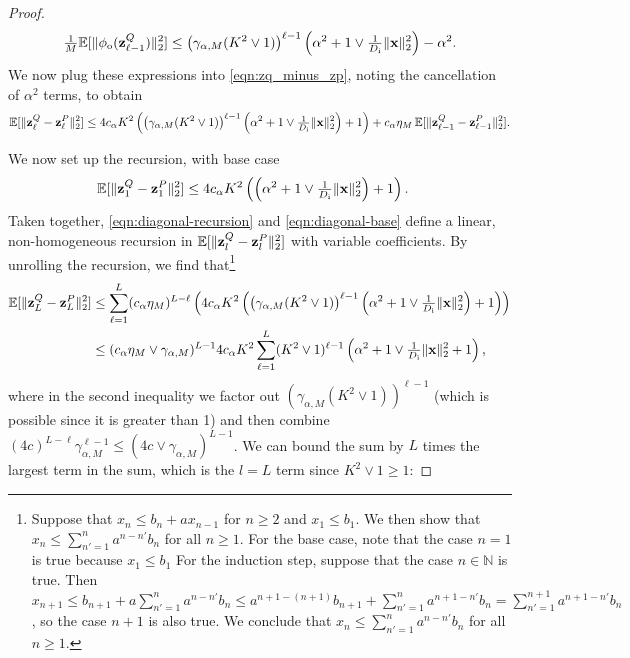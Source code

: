 \documentclass[twoside]{article}
\renewcommand{\ss}[1]{_{\text{#1}}}
\newcommand{\vx}{\mathbf{x}}
\newcommand{\vz}{\mathbf{z}}
\newcommand{\E}{\mathbb{E}}
\newcommand{\N}{\mathbb{N}}
\renewcommand{\ss}[1]{_{\text{#1}}}        %
\DeclarePairedDelimiter\norm{\|}{\|}             %
\theoremstyle{theoremstyle}
\begin{document}
\begin{proof}
\begin{align}
    \tfrac1{M}\E[\norm{\phi\ss{o}(\vz^Q_{\ell-1})}_2^2] \le \left(\gamma_{\alpha,M}(K^2 \lor 1)\right)^{\ell - 1}\left(\alpha^2 + 1\lor \tfrac1{D\ss{i}}\|\vx\|^2_2\right) - \alpha^2.
\end{align}
We now plug these expressions into \cref{eqn:zq_minus_zp}, noting the cancellation of $\alpha^2$ terms, to obtain
\begin{equation}
    \E[\norm{\vz^Q_\ell - \vz^P_\ell}_2^2] \le 
    4c_\alpha K^2 \left( \left(\gamma_{\alpha,M}(K^2 \lor 1)\right)^{\ell - 1}\left(\alpha^2 + 1\lor \tfrac1{D\ss{i}}\|\vx\|^2_2\right) + 1 \right) + c_\alpha \eta_M \, \E[\norm{\vz^Q_{\ell-1} - \vz^P_{\ell-1}}_2^2].\label{eqn:diagonal-recursion}
\end{equation}

We now set up the recursion, with base case
\begin{align}
    \E[\norm{\vz^Q_1 - \vz^P_1}_2^2] &\leq  4c_\alpha K^2 \left(\left(\alpha^2 + 1\lor \tfrac1{D\ss{i}}\|\vx\|^2_2\right)+1\right). \label{eqn:diagonal-base}
\end{align}
Taken together, \cref{eqn:diagonal-recursion} and \cref{eqn:diagonal-base} define a linear, non-homogeneous recursion in $\E[\norm{\vz^Q_l - \vz^P_l}_2^2]$ with variable coefficients.
By unrolling the recursion, we find that\footnote{
    Suppose that $x_n \le b_n + a x_{n-1}$ for $n \ge 2$ and $x_1 \le b_1$.
    We then show that $x_n \le \sum_{n'=1}^n a^{n - n'} b_n$ for all $n \ge 1$.
    For the base case, note that the case $n=1$ is true because $x_1 \le b_1$
    For the induction step, suppose that the case $n \in \N$ is true.
    Then $
        x_{n+1}
        \le b_{n + 1} + a \sum_{n'=1}^n a^{n - n'} b_n
        \le a^{n + 1 - (n+1)} b_{n + 1} + \sum_{n'=1}^n a^{n + 1 - n'} b_n
        =\sum_{n'=1}^{n + 1} a^{n + 1 - n'} b_n
    $, so the case $n + 1$ is also true.
    We conclude that $x_n \le \sum_{n'=1}^n a^{n - n'} b_n$ for all $n \ge 1.$
}
\begin{align}
    \E[\norm{\vz^Q_{L} - \vz^P_{L}}_2^2] 
    &\le \sum_{\ell=1}^{L} (c_\alpha \eta_M)^{L - \ell} \left(4 c_\alpha K^2 \left(\left(\gamma_{\alpha,M}(K^2 \lor 1)\right)^{\ell - 1}\left(\alpha^2 + 1\lor \tfrac1{D\ss{i}}\|\vx\|^2_2\right)+1\right)\right) \\
    &\le (c_\alpha \eta_M \lor \gamma_{\alpha,M})^{L - 1} 4 c_\alpha K^2 \sum_{\ell=1}^{L} (K^2 \lor 1)^{\ell - 1}\left( \alpha^2 + 1\lor \tfrac1{D\ss{i}}\|\vx\|^2_2+1\right),
\end{align}
where in the second inequality we factor out $(\gamma_{\alpha,M}(K^2 \lor 1))^{\ell - 1}$ (which is possible since it is greater than 1) and then combine $(4c)^{L-\ell} \gamma_{\alpha,M}^{\ell -1} \le (4c \lor \gamma_{\alpha,M})^{L - 1}$. We can bound the sum by $L$ times the largest term in the sum, which is the $l=L$ term since $K^2 \lor 1 \ge 1$:

\end{proof}
\end{document}
